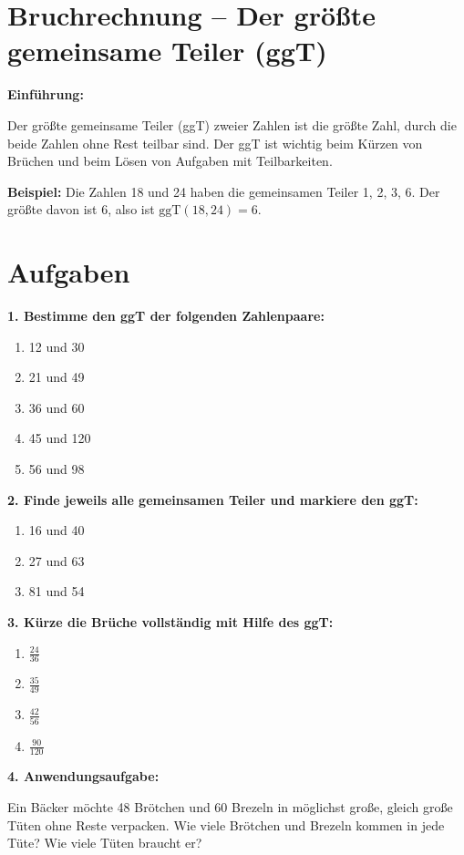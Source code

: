 \section*{Bruchrechnung – Der größte gemeinsame Teiler (ggT)}

\textbf{Einführung:}

Der größte gemeinsame Teiler (ggT) zweier Zahlen ist die größte Zahl, durch die beide Zahlen ohne Rest teilbar sind. Der ggT ist wichtig beim Kürzen von Brüchen und beim Lösen von Aufgaben mit Teilbarkeiten.

\textbf{Beispiel:} Die Zahlen 18 und 24 haben die gemeinsamen Teiler 1, 2, 3, 6. Der größte davon ist 6, also ist $\mathrm{ggT}(18,24) = 6$.

\vspace{1em}

\section*{Aufgaben}

\textbf{1. Bestimme den ggT der folgenden Zahlenpaare:}
\begin{enumerate}[label=\alph*)]
  \item 12 und 30
  \item 21 und 49
  \item 36 und 60
  \item 45 und 120
  \item 56 und 98
\end{enumerate}

\textbf{2. Finde jeweils alle gemeinsamen Teiler und markiere den ggT:}
\begin{enumerate}[label=\alph*)]
  \item 16 und 40
  \item 27 und 63
  \item 81 und 54
\end{enumerate}

\textbf{3. Kürze die Brüche vollständig mit Hilfe des ggT:}
\begin{enumerate}[label=\alph*)]
  \item $\displaystyle{\frac{24}{36}}$
  \item $\displaystyle{\frac{35}{49}}$
  \item $\displaystyle{\frac{42}{56}}$
  \item $\displaystyle{\frac{90}{120}}$
\end{enumerate}

\textbf{4. Anwendungsaufgabe:}

Ein Bäcker möchte 48 Brötchen und 60 Brezeln in möglichst große, gleich große Tüten ohne Reste verpacken. Wie viele Brötchen und Brezeln kommen in jede Tüte? Wie viele Tüten braucht er?